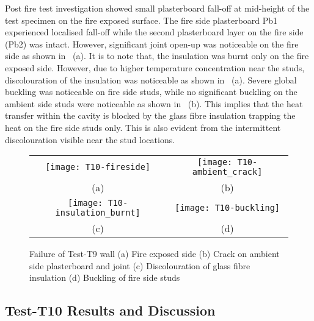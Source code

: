 Post fire test investigation showed small plasterboard fall-off at mid-height of the test specimen on the fire exposed surface. The fire side plasterboard Pb1 experienced localised fall-off while the second plasterboard layer on the fire side (Pb2) was intact. However, significant joint open-up was noticeable on the fire side as shown in ~(a). It is to note that, the insulation was burnt only on the fire exposed side. However, due to higher temperature concentration near the studs, discolouration of the insulation was noticeable as shown in ~(a). Severe global buckling was noticeable on fire side studs, while no significant buckling on the ambient side studs were noticeable as shown in ~(b). This implies that the heat transfer within the cavity is blocked by the glass fibre insulation trapping the heat on the fire side studs only. This is also evident from the intermittent discolouration visible near the stud locations. 
\begin{figure}[!htbp]
	\centering
		\begin{tabular}{cc}
			\texttt{[image: T10-fireside]} & 
			\texttt{[image: T10-ambient\_crack]} \\ 
			(a) & (b) \\ 
			\texttt{[image: T10-insulation\_burnt]} & 
			\texttt{[image: T10-buckling]} \\
			(c) & (d) \\
		\end{tabular} 
		\caption{Failure of Test-T9 wall (a) Fire exposed side (b) Crack on ambient side plasterboard and joint (c) Discolouration of glass fibre insulation (d) Buckling of fire side studs}
		\label{fig:T10-failure}
\end{figure}

\subsection{Test-T10 Results and Discussion}

